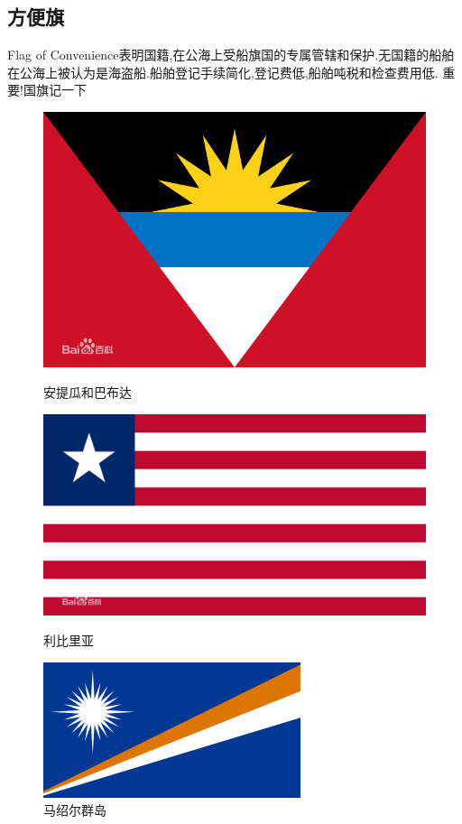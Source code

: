 \documentclass[UTF8,a4paper]{ctexart}
\begin{document}
		\subsection{方便旗}
			 Flag of Convenience表明国籍,在公海上受船旗国的专属管辖和保护.无国籍的船舶在公海上被认为是海盗船.船舶登记手续简化,登记费低,船舶吨税和检查费用低. 重要!国旗记一下
			 \begin{figure}
			 \centering
			 \includegraphics[scale=0.2,trim=0 0 0 0]{antigua}
			 \caption{安提瓜和巴布达}
			 \includegraphics[scale=0.1,trim=0 0 0 0]{liberia}
			 \caption{利比里亚}
		   		\includegraphics[scale=0.5,trim=0 0 0 0]{marshall}
		   		\caption{马绍尔群岛}

\end{figure}
\end{document}
